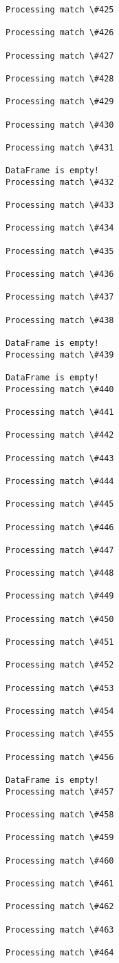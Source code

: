 \documentclass[11pt]{article}
\begin{document}
\begin{Verbatim}[commandchars=\\\{\}]
Processing match \#425

Processing match \#426

Processing match \#427

Processing match \#428

Processing match \#429

Processing match \#430

Processing match \#431

DataFrame is empty!
Processing match \#432

Processing match \#433

Processing match \#434

Processing match \#435

Processing match \#436

Processing match \#437

Processing match \#438

DataFrame is empty!
Processing match \#439

DataFrame is empty!
Processing match \#440

Processing match \#441

Processing match \#442

Processing match \#443

Processing match \#444

Processing match \#445

Processing match \#446

Processing match \#447

Processing match \#448

Processing match \#449

Processing match \#450

Processing match \#451

Processing match \#452

Processing match \#453

Processing match \#454

Processing match \#455

Processing match \#456

DataFrame is empty!
Processing match \#457

Processing match \#458

Processing match \#459

Processing match \#460

Processing match \#461

Processing match \#462

Processing match \#463

Processing match \#464


\end{Verbatim}
\end{document}
